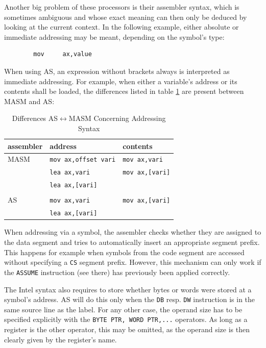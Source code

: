 \documentclass[12pt,twoside]{report}
\newcommand{\tty}[1]{{\tt #1}}
\newcommand{\asname}{{AS}}
\begin{document}
Another big problem of these processors is their assembler syntax,
which is sometimes ambiguous and whose exact meaning can then only be
deduced by looking at the current context.  In the following example,
either absolute or immediate addressing may be meant, depending on
the symbol's type:
\begin{verbatim}
        mov     ax,value
\end{verbatim}
When using \asname{}, an expression without brackets always is interpreted
as immediate addressing.  For example, when either a variable's
address or its contents shall be loaded, the differences listed in table
\ref{TabMASM} are present between MASM and \asname{}:
\begin{table}
\begin{center}\begin{tabular}{|l|l|l|}
\hline
assembler  & address             & contents \\
\hline
\hline
MASM       &  \tty{mov ax,offset vari} &  \tty{mov ax,vari} \\
           &  \tty{lea ax,vari}        &  \tty{mov ax,[vari]} \\
           &  \tty{lea ax,[vari]}      & \\
           &                           & \\
\asname{}         &  \tty{mov ax,vari}        &  \tty{mov ax,[vari]} \\
           &  \tty{lea ax,[vari]}      & \\
\hline
\end{tabular}\end{center}
\caption{Differences \asname{}$\leftrightarrow$MASM Concerning Addressing
         Syntax\label{TabMASM}}
\end{table}
\par
When addressing via a symbol, the assembler checks whether they are
assigned to the data segment and tries to automatically insert an
appropriate segment prefix.  This happens for example when symbols
from the code segment are accessed without specifying a \tty{CS} segment
prefix.  However, this mechanism can only work if the \tty{ASSUME}
instruction (see there) has previously been applied correctly.

The Intel syntax also requires to store whether bytes or words were
stored at a symbol's address.  \asname{} will do this only when the \tty{DB} resp.
\tty{DW} instruction is in the same source line as the label.  For any
other case, the operand size has to be specified explicitly with the
\tty{BYTE PTR, WORD PTR,...} operators.  As long as a register is the other
operator, this may be omitted, as the operand size is then clearly
given by the register's name.
\end{document}
